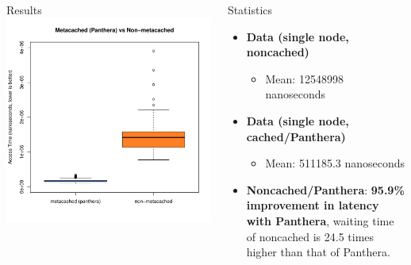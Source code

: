 \documentclass[final]{beamer} %
\begin{document}
\begin{frame}
\begin{columns}[t]
\begin{column}{0.32\textwidth}
\begin{block}{Results}
		\vspace{1em}
		\includegraphics[scale=1.2]{assets/box-plot-meta-multinode.pdf}
	\end{block}

	  
      \end{column}
      
      
      \begin{column}{0.32\textwidth}
    \begin{block}{Statistics}
    \begin{itemize}
    		\item \textbf{Data (single node, noncached)}
    		\begin{itemize}
    			\item Mean: 12548998 nanoseconds
    		\end{itemize}
    		\item \textbf{Data (single node, cached/Panthera)}
    		\begin{itemize}
    			\item Mean: 511185.3 nanoseconds
    		\end{itemize}
    		\item \textbf{Noncached/Panthera}: \textbf{95.9\% improvement in latency with Panthera}, waiting time of noncached is 24.5 times higher than that of Panthera.
    		

\end{itemize}
\end{block}
\end{column}
\end{columns}
\end{frame}
\end{document}
